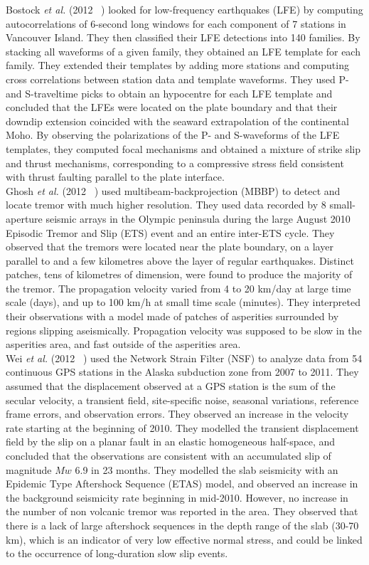 \documentclass[main.tex]{subfiles}
\begin{document}
Bostock \textit{et al.} (2012 ~\cite{BOS_2012}) looked for low-frequency earthquakes (LFE) by computing autocorrelations of 6-second long windows for each component of 7 stations in Vancouver Island. They then classified their LFE detections into 140 families. By stacking all waveforms of a given family, they obtained an LFE template for each family. They extended their templates by adding more stations and computing cross correlations between station data and template waveforms. They used P- and S-traveltime picks to obtain an hypocentre for each LFE template and concluded that the LFEs were located on the plate boundary and that their downdip extension coincided with the seaward extrapolation of the continental Moho. By observing the polarizations of the P- and S-waveforms of the LFE templates, they computed focal mechanisms and obtained a mixture of strike slip and thrust mechanisms, corresponding to a compressive stress field consistent with thrust faulting parallel to the plate interface. \\

Ghosh \textit{et al.} (2012 ~\cite{GHO_2012}) used multibeam-backprojection (MBBP) to detect and locate tremor with much higher resolution. They used data recorded by 8 small-aperture seismic arrays in the Olympic peninsula during the large August 2010 Episodic Tremor and Slip (ETS) event and an entire inter-ETS cycle. They observed that the tremors were located near the plate boundary, on a layer parallel to and a few kilometres above the layer of regular earthquakes. Distinct patches, tens of kilometres of dimension, were found to produce the majority of the tremor. The propagation velocity varied from 4 to 20 km/day at large time scale (days), and up to 100 km/h at small time scale (minutes). They interpreted their observations with a model made of patches of asperities surrounded by regions slipping aseismically. Propagation velocity was supposed to be slow in the asperities area, and fast outside of the asperities area. \\

Wei \textit{et al.} (2012 ~\cite{WEI_2012}) used the Network Strain Filter (NSF) to analyze data from 54 continuous GPS stations in the Alaska subduction zone from 2007 to 2011. They assumed that the displacement observed at a GPS station is the sum of the secular velocity, a transient field, site-specific noise, seasonal variations, reference frame errors, and observation errors. They observed an increase in the velocity rate starting at the beginning of 2010. They modelled the transient displacement field by the slip on a planar fault in an elastic homogeneous half-space, and concluded that the observations are consistent with an accumulated slip of magnitude $Mw$ 6.9 in 23 months. They modelled the slab seismicity with an Epidemic Type Aftershock Sequence (ETAS) model, and observed an increase in the background seismicity rate beginning in mid-2010. However, no increase in the number of non volcanic tremor was reported in the area. They observed that there is a lack of large aftershock sequences in the depth range of the slab (30-70 km), which is an indicator of very low effective normal stress, and could be linked to the occurrence of long-duration slow slip events. \\
\end{document}
